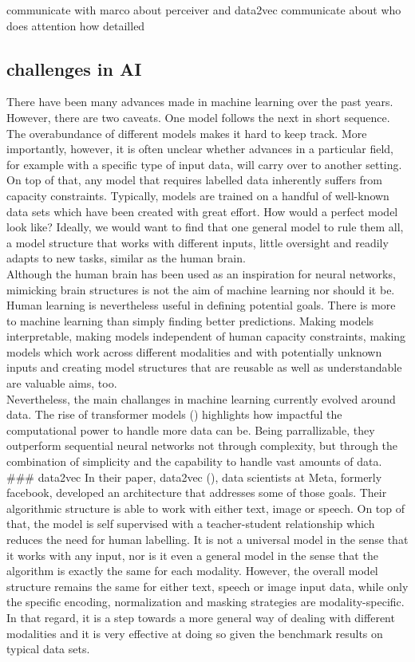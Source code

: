 \documentclass[
]{krantz}
\begin{document}
communicate with marco about perceiver and data2vec
communicate about who does attention how detailled

\hypertarget{challenges-in-ai}{%
\subsection{challenges in AI}\label{challenges-in-ai}}

There have been many advances made in machine learning over the past years. However, there are two caveats. One model follows the next in short sequence. The overabundance of different models makes it hard to keep track. More importantly, however, it is often unclear whether advances in a particular field, for example with a specific type of input data, will carry over to another setting. On top of that, any model that requires labelled data inherently suffers from capacity constraints. Typically, models are trained on a handful of well-known data sets which have been created with great effort. How would a perfect model look like? Ideally, we would want to find that one general model to rule them all, a model structure that works with different inputs, little oversight and readily adapts to new tasks, similar as the human brain.\\
Although the human brain has been used as an inspiration for neural networks, mimicking brain structures is not the aim of machine learning nor should it be. Human learning is nevertheless useful in defining potential goals. There is more to machine learning than simply finding better predictions. Making models interpretable, making models independent of human capacity constraints, making models which work across different modalities and with potentially unknown inputs and creating model structures that are reusable as well as understandable are valuable aims, too.\\
Nevertheless, the main challanges in machine learning currently evolved around data. The rise of transformer models (\citet{vaswani2017attention}) highlights how impactful the computational power to handle more data can be. Being parrallizable, they outperform sequential neural networks not through complexity, but through the combination of simplicity and the capability to handle vast amounts of data.\\

\#\#\# data2vec
In their paper, data2vec (\citet{baevski2022data2vec}), data scientists at Meta, formerly facebook, developed an architecture that addresses some of those goals. Their algorithmic structure is able to work with either text, image or speech. On top of that, the model is self supervised with a teacher-student relationship which reduces the need for human labelling. It is not a universal model in the sense that it works with any input, nor is it even a general model in the sense that the algorithm is exactly the same for each modality. However, the overall model structure remains the same for either text, speech or image input data, while only the specific encoding, normalization and masking strategies are modality-specific. In that regard, it is a step towards a more general way of dealing with different modalities and it is very effective at doing so given the benchmark results on typical data sets.
\end{document}
